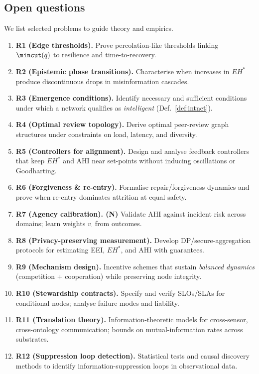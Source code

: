 \documentclass[12pt]{article}
\begin{document}
\subsection{Open questions} We list selected problems to guide theory and empirics.

\begin{enumerate}[leftmargin=1.2em]
\item \textbf{R1 (Edge thresholds).} Prove percolation-like thresholds linking $\mincut(\bar{q})$ to resilience and time-to-recovery.
\item \textbf{R2 (Epistemic phase transitions).} Characterise when increases in $EH^{\ast}$ produce discontinuous drops in misinformation cascades.
\item \textbf{R3 (Emergence conditions).} Identify necessary and sufficient conditions under which a network qualifies as \emph{intelligent} (Def.~\ref{def:intnet}).
\item \textbf{R4 (Optimal review topology).} Derive optimal peer-review graph structures under constraints on load, latency, and diversity.
\item \textbf{R5 (Controllers for alignment).} Design and analyse feedback controllers that keep $EH^{\ast}$ and AHI near set-points without inducing oscillations or Goodharting.
\item \textbf{R6 (Forgiveness \& re-entry).} Formalise repair/forgiveness dynamics and prove when re-entry dominates attrition at equal safety.
\item \textbf{R7 (Agency calibration). (N)} Validate AHI against incident risk across domains; learn weights $v_{\cdot}$ from outcomes.
\item \textbf{R8 (Privacy-preserving measurement).} Develop DP/secure-aggregation protocols for estimating EEI, $EH^{\ast}$, and AHI with guarantees.
\item \textbf{R9 (Mechanism design).} Incentive schemes that sustain \emph{balanced dynamics} (competition + cooperation) while preserving node integrity.
\item \textbf{R10 (Stewardship contracts).} Specify and verify SLOs/SLAs for conditional nodes; analyse failure modes and liability.
\item \textbf{R11 (Translation theory).} Information-theoretic models for cross-sensor, cross-ontology communication; bounds on mutual-information rates across substrates.
\item \textbf{R12 (Suppression loop detection).} Statistical tests and causal discovery methods to identify information-suppression loops in observational data.

\end{enumerate}
\end{document}
